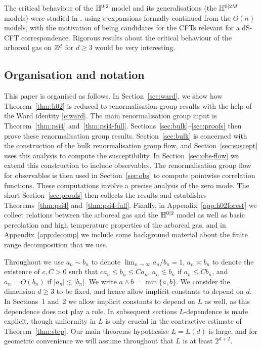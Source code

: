 \documentclass[11pt]{amsart}
\numberwithin{equation}{section}
\numberwithin{theorem}{section}
\newcommand{\1}{{\bf 1}}
\begin{document}
The critical behaviour of the ${\mathbb H}^{0|2}$ model and its generalisations (the ${\mathbb H}^{0|2M}$ models)
were studied in \cite{MR3429411,MR4382903}, using $\epsilon$-expansions formally continued from the $O(n)$ models,
with the motivation of being candidates for the CFTs relevant for
a dS-CFT correspondence. Rigorous results about the critical
behaviour of the arboreal gas on $\mathbb{Z}^{d}$ for $d\geq 3$ would be
very interesting.

\subsection{Organisation and notation}

This paper is organised as follows.  In Section~\ref{sec:ward}, we
show how Theorem~\ref{thm:h02} is reduced to renormalisation group
results with the help of the Ward identity \eqref{e:ward}. 
The main renormalisation group input is Theorem~\ref{thm:psi4}
and~\ref{thm:psi4-full}. Sections~\ref{sec:bulk}--\ref{sec:proofs}
then prove these renormalisation group results.
Section~\ref{sec:bulk} is concerned with the construction of the bulk
renormalisation group flow, and Section~\ref{sec:suscept} uses this
analysis to compute the susceptibility. In
Section~\ref{sec:obs-flow} we extend this construction to
include observables. The renormalisation group flow for observables
is then used in Section~\ref{sec:obs} to compute pointwise correlation
functions. These computations involve a precise analysis of
the zero mode. The short Section~\ref{sec:proofs} then collects the
results and establishes Theorems~\ref{thm:psi4}
and~\ref{thm:psi4-full}. Finally, in Appendix~\ref{app:h02forest}
we collect relations between the arboreal gas and the $\mathbb{H}^{0|2}$
model as well as basic percolation and high temperature properties
of the arboreal gas, and in Appendix~\ref{app:decomp} we
include some background material about the finite range
decomposition that we use.

Throughout we use $a_{n}\sim b_{n}$ to denote
$\lim_{n\to\infty}a_{n}/b_{n}=1$, $a_{n}\asymp b_{n}$ to denote the
existence of $c,C>0$ such that $c a_{n}\leq b_{n}\leq Ca_{n}$,
$a_n \lesssim b_n$ if $a_n \leq Cb_n$, and $a_{n}=O(b_{n})$ if
$|a_{n}|\lesssim |b_{n}|$. We write $a\wedge b = \min \{a,b\}$.
We consider the dimension $d \geq 3$
to be fixed, and hence allow implicit constants to depend on $d$.  In
Sections~1 and~2 we allow implicit constants to depend on $L$ as well,
as this dependence does not play a role.  In subsequent sections
$L$-dependence is made explicit, though uniformity in $L$ is only
crucial in the contractive estimate of Theorem~\ref{thm:step}.  Our
main theorems hypothesise $L=L(d)$ is large, and for geometric
convenience we will assume throughout that $L$ is at least $2^{d+2}$.
\end{document}

